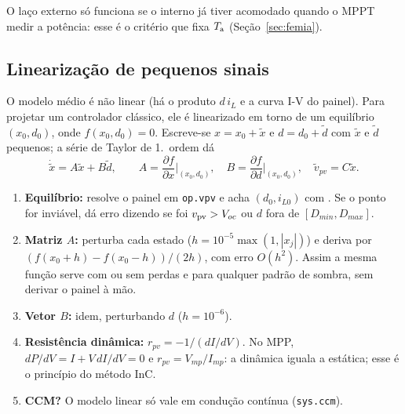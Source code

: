 O la\c{c}o externo s\'o funciona se o interno j\'a tiver acomodado quando o MPPT medir a pot\^encia: esse \'e o crit\'erio que
fixa $T_{\mathrm{a}}$ (Se\c{c}\~ao~\ref{sec:femia}).

\subsection{Lineariza\c{c}\~ao de pequenos sinais}

O modelo m\'edio \'e n\~ao linear (h\'a o produto $d\,i_L$ e a curva I-V do painel). Para projetar um controlador cl\'assico,
ele \'e linearizado em torno de um equil\'ibrio $(x_0,d_0)$, onde $f(x_0,d_0)=0$. Escreve-se $x=x_0+\tilde x$ e $d=d_0+\tilde d$
com $\tilde x$ e $\tilde d$ pequenos; a s\'erie de Taylor de 1.\textordmasculine\ ordem d\'a
\begin{equation}
\dot{\tilde x}=A\tilde x+B\tilde d,\qquad A=\frac{\partial f}{\partial x}\Big|_{(x_0,d_0)},\quad
B=\frac{\partial f}{\partial d}\Big|_{(x_0,d_0)},\quad \tilde v_{pv}=C\tilde x .
\end{equation}


\begin{logica}
\begin{enumerate}
\item \textbf{Equil\'ibrio:} resolve o painel em \texttt{op.vpv} e acha $(d_0,i_{L0})$ com . Se o ponto for
 invi\'avel, d\'a erro dizendo se foi $v_{\mathrm{pv}}>V_{oc}$ ou $d$ fora de $[D_{min},D_{max}]$.
\item \textbf{Matriz $A$:} perturba cada estado ($h=10^{-5}\max(1,|x_j|)$) e deriva por $(f(x_0+h)-f(x_0-h))/(2h)$, com erro $O(h^2)$.
 Assim a mesma fun\c{c}\~ao serve com ou sem perdas e para qualquer padr\~ao de sombra, sem derivar o painel \`a m\~ao.
\item \textbf{Vetor $B$:} idem, perturbando $d$ ($h=10^{-6}$).
\item \textbf{Resist\^encia din\^amica:} $r_{pv}=-1/(dI/dV)$. No MPP, $dP/dV=I+V\,dI/dV=0$ e $r_{pv}=V_{mp}/I_{mp}$: a din\^amica
 iguala a est\'atica; esse \'e o princ\'ipio do m\'etodo InC.
\item \textbf{CCM?} O modelo linear s\'o vale em condu\c{c}\~ao cont\'inua (\texttt{sys.ccm}).
\end{enumerate}
\end{logica}

